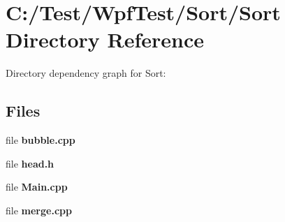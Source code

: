 \section{C\-:/\-Test/\-Wpf\-Test/\-Sort/\-Sort Directory Reference}
\label{dir_ba9a08b7df02a11ac02ecdf70a08e4f5}
Directory dependency graph for Sort\-:
\subsection*{Files}
\begin{DoxyCompactItemize}
\item 
file {\bf bubble.\-cpp}
\item 
file {\bf head.\-h}
\item 
file {\bf Main.\-cpp}
\item 
file {\bf merge.\-cpp}
\end{DoxyCompactItemize}

